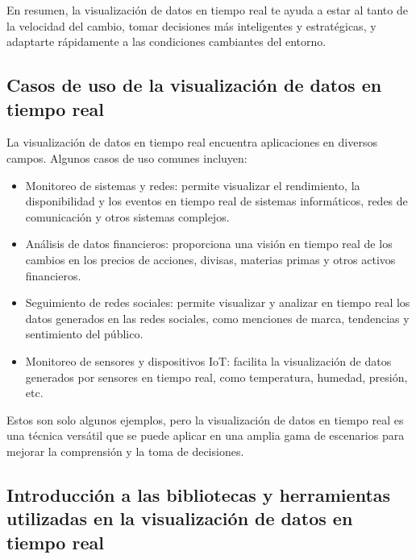 \documentclass[
  a4paper,
]{article}
\begin{document}
En resumen, la visualización de datos en tiempo real te ayuda a estar al
tanto de la velocidad del cambio, tomar decisiones más inteligentes y
estratégicas, y adaptarte rápidamente a las condiciones cambiantes del
entorno.

\hypertarget{casos-de-uso-de-la-visualizaciuxf3n-de-datos-en-tiempo-real}{%
\subsection{Casos de uso de la visualización de datos en tiempo
real}\label{casos-de-uso-de-la-visualizaciuxf3n-de-datos-en-tiempo-real}}

La visualización de datos en tiempo real encuentra aplicaciones en
diversos campos. Algunos casos de uso comunes incluyen:

\begin{itemize}
\item
  Monitoreo de sistemas y redes: permite visualizar el rendimiento, la
  disponibilidad y los eventos en tiempo real de sistemas informáticos,
  redes de comunicación y otros sistemas complejos.
\item
  Análisis de datos financieros: proporciona una visión en tiempo real
  de los cambios en los precios de acciones, divisas, materias primas y
  otros activos financieros.
\item
  Seguimiento de redes sociales: permite visualizar y analizar en tiempo
  real los datos generados en las redes sociales, como menciones de
  marca, tendencias y sentimiento del público.
\item
  Monitoreo de sensores y dispositivos IoT: facilita la visualización de
  datos generados por sensores en tiempo real, como temperatura,
  humedad, presión, etc.
\end{itemize}

Estos son solo algunos ejemplos, pero la visualización de datos en
tiempo real es una técnica versátil que se puede aplicar en una amplia
gama de escenarios para mejorar la comprensión y la toma de decisiones.

\hypertarget{introducciuxf3n-a-las-bibliotecas-y-herramientas-utilizadas-en-la-visualizaciuxf3n-de-datos-en-tiempo-real}{%
\subsection{Introducción a las bibliotecas y herramientas utilizadas en
la visualización de datos en tiempo
real}\label{introducciuxf3n-a-las-bibliotecas-y-herramientas-utilizadas-en-la-visualizaciuxf3n-de-datos-en-tiempo-real}}
\end{document}
